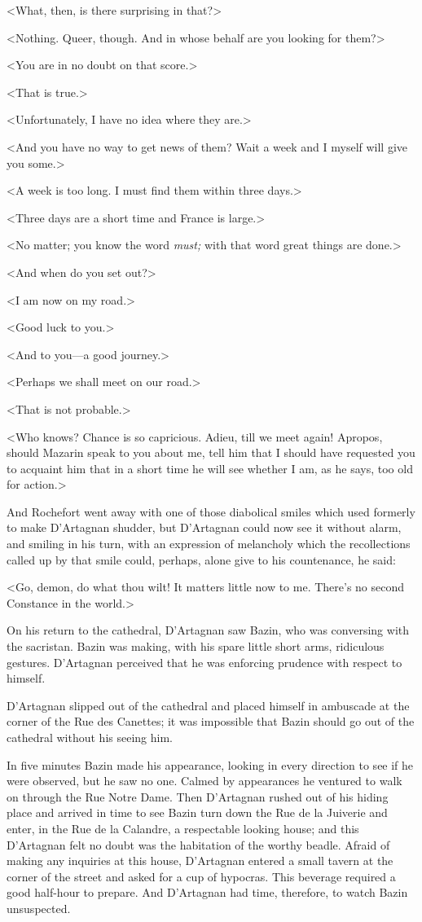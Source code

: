 <What, then, is there surprising in that?>

<Nothing. Queer, though. And in whose behalf are you looking for them?>

<You are in no doubt on that score.>

<That is true.>

<Unfortunately, I have no idea where they are.>

<And you have no way to get news of them? Wait a week and I myself will give you some.>

<A week is too long. I must find them within three days.>

<Three days are a short time and France is large.>

<No matter; you know the word \emph{must;} with that word great things are done.>

<And when do you set out?>

<I am now on my road.>

<Good luck to you.>

<And to you—a good journey.>

<Perhaps we shall meet on our road.>

<That is not probable.>

<Who knows? Chance is so capricious. Adieu, till we meet again! Apropos, should Mazarin speak to you about me, tell him that I should have requested you to acquaint him that in a short time he will see whether I am, as he says, too old for action.>

And Rochefort went away with one of those diabolical smiles which used formerly to make D'Artagnan shudder, but D'Artagnan could now see it without alarm, and smiling in his turn, with an expression of melancholy which the recollections called up by that smile could, perhaps, alone give to his countenance, he said:

<Go, demon, do what thou wilt! It matters little now to me. There's no second Constance in the world.>

On his return to the cathedral, D'Artagnan saw Bazin, who was conversing with the sacristan. Bazin was making, with his spare little short arms, ridiculous gestures. D'Artagnan perceived that he was enforcing prudence with respect to himself.

D'Artagnan slipped out of the cathedral and placed himself in ambuscade at the corner of the Rue des Canettes; it was impossible that Bazin should go out of the cathedral without his seeing him.

In five minutes Bazin made his appearance, looking in every direction to see if he were observed, but he saw no one. Calmed by appearances he ventured to walk on through the Rue Notre Dame. Then D'Artagnan rushed out of his hiding place and arrived in time to see Bazin turn down the Rue de la Juiverie and enter, in the Rue de la Calandre, a respectable looking house; and this D'Artagnan felt no doubt was the habitation of the worthy beadle. Afraid of making any inquiries at this house, D'Artagnan entered a small tavern at the corner of the street and asked for a cup of hypocras. This beverage required a good half-hour to prepare. And D'Artagnan had time, therefore, to watch Bazin unsuspected.

